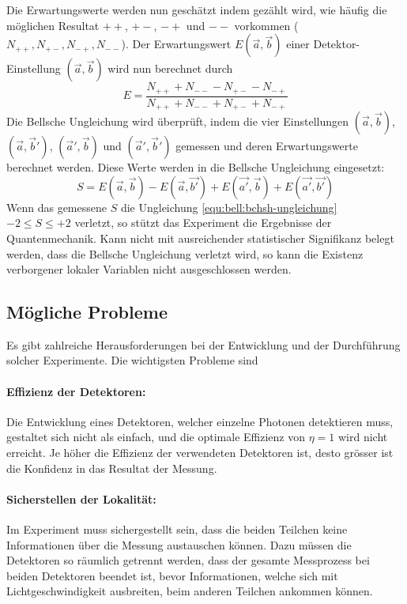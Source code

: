 \begin{refsection}
Die Erwartungswerte werden nun gesch\"atzt indem gez\"ahlt
wird, wie h\"aufig die m\"oglichen Resultat $++$, $+-$, $-+$ und $--$
vorkommen ($N_{++}, N_{+-}, N_{-+}, N_{--}$).
Der Erwartungswert $E(\vec{a},\vec{b})$ einer Detektor-Einstellung 
$(\vec{a},\vec{b})$ wird nun berechnet durch
\begin{equation}
    E = \frac{N_{++} + N_{--} - N_{+-} - N_{-+}}{N_{++} + N_{--} + N_{+-} + N_{-+}}
\end{equation}
Die Bellsche Ungleichung wird \"uberpr\"uft, indem die vier Einstellungen
$(\vec{a},\vec{b})$, $(\vec{a},\vec{b}')$, $(\vec{a}',\vec{b})$
und $(\vec{a}',\vec{b}')$ gemessen und deren Erwartungswerte berechnet werden. 
Diese Werte werden in die Bellsche Ungleichung eingesetzt:
\begin{equation}
    S = E(\vec{a},\vec{b}) - E(\vec{a},\vec{b'}) + E(\vec{a'},\vec{b}) + E(\vec{a'},\vec{b'})
\end{equation}
Wenn das gemessene $S$ die Ungleichung \eqref{equ:bell:bchsh-ungleichung} 
$-2 \leq S \leq +2$
verletzt, so st\"utzt das Experiment die Ergebnisse der Quantenmechanik.
Kann nicht mit ausreichender statistischer Signifikanz belegt werden, dass
die Bellsche Ungleichung verletzt wird, so kann die Existenz verborgener
lokaler Variablen nicht ausgeschlossen werden.

\subsection{M\"ogliche Probleme}
Es gibt zahlreiche Herausforderungen bei der Entwicklung und der Durchf\"uhrung
solcher Experimente.
Die wichtigsten Probleme sind

\paragraph{Effizienz der Detektoren:}
Die Entwicklung eines Detektoren, welcher einzelne Photonen detektieren muss,
gestaltet sich nicht als einfach, und die optimale Effizienz von $\eta = 1$ wird
nicht erreicht.
Je h\"oher die Effizienz der verwendeten Detektoren ist, desto gr\"osser ist die
Konfidenz in das Resultat der Messung. 

\paragraph{Sicherstellen der Lokalit\"at:}
Im Experiment muss sichergestellt sein, dass die beiden Teilchen keine
Informationen \"uber die Messung austauschen k\"onnen.
Dazu m\"ussen die Detektoren so r\"aumlich getrennt werden, dass
der gesamte Messprozess bei beiden Detektoren beendet ist, bevor Informationen,
welche sich mit Lichtgeschwindigkeit ausbreiten, beim anderen Teilchen
ankommen k\"onnen. 


\end{refsection}
